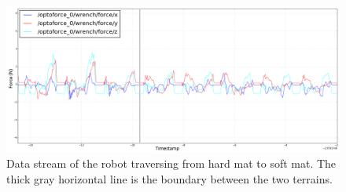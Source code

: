 \documentclass[USenglish]{ifimaster}  %
\begin{document}
	
	
	\begin{figure}[h]
		\centering
		\includegraphics[width=\textwidth,height=\textheight,keepaspectratio]{Figures/MB3MM_line3}
		\caption[Data stream of the transition from hard mat to soft mat.]{Data stream of the robot traversing from hard mat to soft mat. The thick gray horizontal line is the boundary between the two terrains.}
		\label{fig:hardmatSoftMat}
	\end{figure}
	
	\begin{table}[h]
		\centering
		\caption[Results of transistion from hard mat to floor]{Estimated probability of each terrain per step walking from hard mat to soft mat. Values are marked green to represent correct predictions. For incorrect predictions, the actual value is marked yellow while the predicted value is marked red.}
		\label{hardmatSoftMat}
	\end{table}
	\FloatBarrier
	\clearpage
	
\end{document}
